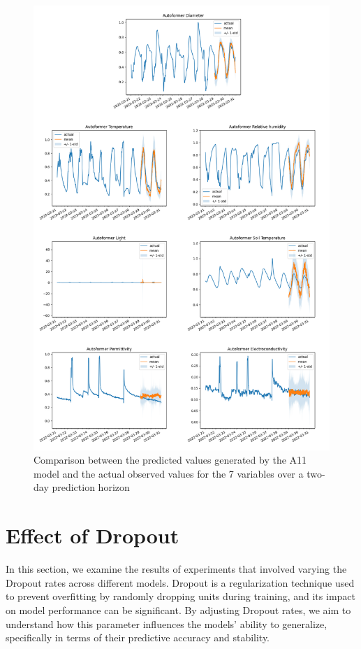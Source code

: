 \begin{figure}[htbp]
    \centering
    \includegraphics[width=15 cm]{6_ChapterResults/figuras/A11.png}
    \caption{Comparison between the predicted values generated by the A11 model and the actual observed values for the 7 variables over a two-day prediction horizon}
    \label{A11}
\end{figure}

\section{Effect of Dropout}
In this section, we examine the results of experiments that involved varying the Dropout rates across different models. Dropout is a regularization technique used to prevent overfitting by randomly dropping units during training, and its impact on model performance can be significant. By adjusting Dropout rates, we aim to understand how this parameter influences the models' ability to generalize, specifically in terms of their predictive accuracy and stability.

